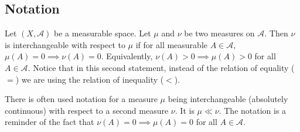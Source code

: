 \subsection*{Notation}

Let $(X, \mathcal{A} )$ be a measurable space.
Let $\mu $ and $\nu $ be two measures on $\mathcal{A} $.
Then $\nu $ is interchangeable with respect to $\mu $ if for all measurable $A \in \mathcal{A} $, $\mu (A) = 0 \implies \nu (A) = 0$.
Equivalently, $\nu (A) > 0 \implies \mu (A) > 0$ for all $A \in \mathcal{A} $.
Notice that in this second statement, instead of the relation of equality ($=$) we are using the relation of inequality ($<$).


There is often used notation for a measure $\mu $ being interchangeable (absolutely continuous) with respect to a second measure $\nu $.
It is $\mu  \ll \nu $.
The notation is a reminder of the fact that $\nu (A) = 0 \implies \mu (A) = 0$ for all $A \in \mathcal{A} $.
